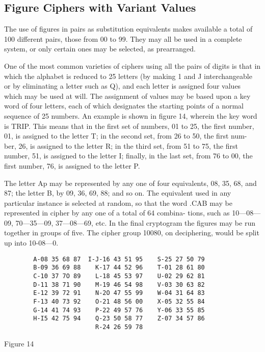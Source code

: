 \subsection{Figure Ciphers with Variant Values}

\mypara The use of ﬁgures in pairs as substitution equivalents makes available a total of 100 different pairs, those from 00 to 99. They may all
be used in a complete system, or only certain ones may be selected, as
prearranged.

\mypara One of the most common varieties of ciphers using all the pairs of
digits is that in which the alphabet is reduced to 25 letters (by making
1 and J interchangeable or by eliminating a letter such as Q), and each
letter is assigned four values which may be used at will. The assignment
of values may be based upon a key word of four letters, each of which
designates the starting points of a normal sequence of 25 numbers. An
example is shown in ﬁgure 14, wherein the key word is TRIP. This
means that in the ﬁrst set of numbers, 01 to 25, the ﬁrst number, 01, is
assigned to the letter T; in the second set, from 26 to 50, the ﬁrst num-
ber, 26, is assigned to the letter R; in the third set, from 51 to 75, the
ﬁrst number, 51, is assigned to the letter I; ﬁnally, in the last set, from
76 to 00, the ﬁrst number, 76, is assigned to the letter P.

The letter Ap may be represented by any one of four equivalents, 08,
35, 68, and 87; the letter B, by 09, 36, 69, 88; and so on. The equivalent
used in any particular instance is selected at random, so that the word
.CAB may be represented in cipher by any one of a total of 64 combina-
tions, such as 10—08—09, 70—35—09, 37—08—69, etc. In the ﬁnal cryptogram
the ﬁgures may be run together in groups of ﬁve. The cipher group
10080, on deciphering, would be split up into 10-08—0.

\begin{textfigure}
        \begin{verbatim}
        A-08 35 68 87  I-J-16 43 51 95    S-25 27 50 79
        B-09 36 69 88    K-17 44 52 96    T-01 28 61 80
        C-10 37 7O 89    L-18 45 53 97    U-02 29 62 81
        D-11 38 71 90    M-19 46 54 98    V-03 30 63 82
        E-12 39 72 91    N-2O 47 55 99    W-04 31 64 83
        F-13 40 73 92    O-21 48 56 00    X-05 32 55 84
        G-14 41 74 93    P-22 49 57 76    Y-06 33 55 85
        H-I5 42 75 94    Q-23 50 58 77    Z-07 34 57 86
                         R-24 26 59 78
        \end{verbatim}
        \caption{Figure 14}
\end{textfigure}

